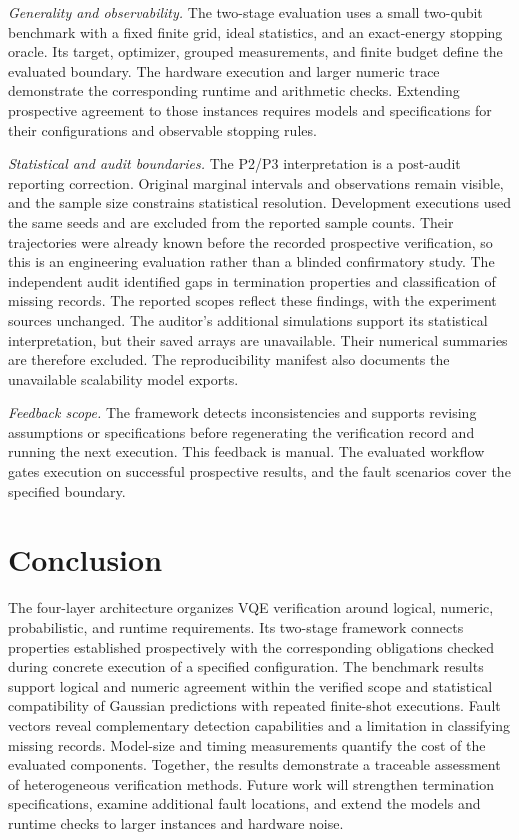 \documentclass[conference]{IEEEtran}
\begin{document}
\emph{Generality and observability.} The two-stage evaluation uses a small two-qubit benchmark with a fixed finite grid, ideal statistics, and an exact-energy stopping oracle. Its target, optimizer, grouped measurements, and finite budget define the evaluated boundary. The hardware execution and larger numeric trace demonstrate the corresponding runtime and arithmetic checks. Extending prospective agreement to those instances requires models and specifications for their configurations and observable stopping rules.

\emph{Statistical and audit boundaries.} The P2/P3 interpretation is a post-audit reporting correction. Original marginal intervals and observations remain visible, and the sample size constrains statistical resolution. Development executions used the same seeds and are excluded from the reported sample counts. Their trajectories were already known before the recorded prospective verification, so this is an engineering evaluation rather than a blinded confirmatory study. The independent audit identified gaps in termination properties and classification of missing records. The reported scopes reflect these findings, with the experiment sources unchanged. The auditor's additional simulations support its statistical interpretation, but their saved arrays are unavailable. Their numerical summaries are therefore excluded. The reproducibility manifest also documents the unavailable scalability model exports.

\emph{Feedback scope.} The framework detects inconsistencies and supports revising assumptions or specifications before regenerating the verification record and running the next execution. This feedback is manual. The evaluated workflow gates execution on successful prospective results, and the fault scenarios cover the specified boundary.

\section{Conclusion}
The four-layer architecture organizes VQE verification around logical, numeric, probabilistic, and runtime requirements. Its two-stage framework connects properties established prospectively with the corresponding obligations checked during concrete execution of a specified configuration. The benchmark results support logical and numeric agreement within the verified scope and statistical compatibility of Gaussian predictions with repeated finite-shot executions. Fault vectors reveal complementary detection capabilities and a limitation in classifying missing records. Model-size and timing measurements quantify the cost of the evaluated components. Together, the results demonstrate a traceable assessment of heterogeneous verification methods. Future work will strengthen termination specifications, examine additional fault locations, and extend the models and runtime checks to larger instances and hardware noise.
\end{document}

